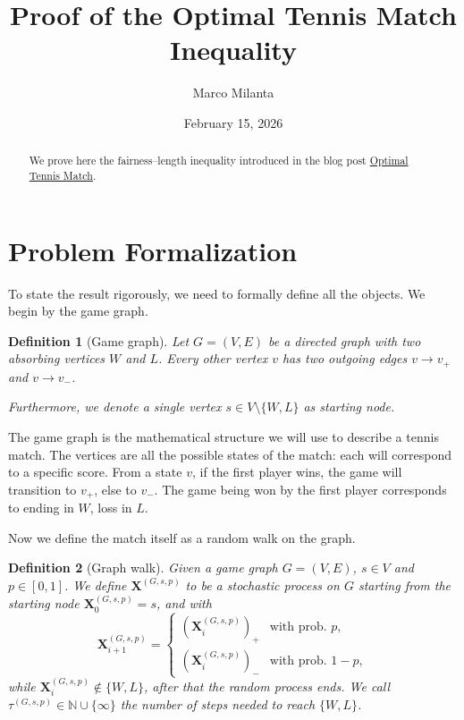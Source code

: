 \documentclass{article}
\newtheorem{definition}{Definition}
\newcommand{\win}{W}
\newcommand{\lose}{L}
\newcommand{\start}{s}
\newcommand{\x}{\mathbf{X}}
\newcommand{\xgp}{\x^{\left(G, s, p\right)}}
\newcommand{\taugp}{{\tau^{\left(G, s, p\right)}}}
\begin{document}
\title{Proof of the Optimal Tennis Match Inequality}
\author{Marco Milanta}
\date{February 15, 2026}
\maketitle

\begin{abstract}
We prove here the fairness--length inequality introduced in the blog post \href{https://mmilanta.github.io/optimal-tennis-match/}{Optimal Tennis Match}.
\end{abstract}

\section*{Problem Formalization}
To state the result rigorously, we need to formally define all the objects. We begin by the game graph.

\begin{definition}[Game graph]
Let $G = (V, E)$ be a directed graph with two absorbing vertices \(\win\) and \(\lose\). Every other vertex \(v\) has two outgoing edges $v\to v_+$ and $v\to v_-$.

Furthermore, we denote a single vertex $\start\in V\setminus \{\win,\lose\}$ as starting node.
\end{definition}

The game graph is the mathematical structure we will use to describe a tennis match. The vertices are all the possible states of the match: each will correspond to a specific score. From a state $v$, if the first player wins, the game will transition to $v_+$, else to $v_-$. The game being won by the first player corresponds to ending in $\win$, loss in $\lose$.

Now we define the match itself as a random walk on the graph.

\begin{definition}[Graph walk]
Given a game graph $G = (V, E)$, $\start \in V$ and $p \in [0,1]$. We define $\xgp$
to be a stochastic process on $G$ starting from the starting node $\xgp_0 = \start$, and with
$$
\xgp_{i+1}= \begin{cases}
\left(\xgp_i\right)_+ & \text{with prob. } p, \\
\left(\xgp_i\right)_- & \text{with prob. } 1 - p,
\end{cases}
$$
while $\xgp_i\notin \{\win, \lose\}$, after that the random process ends. We call $\taugp \in \mathbb N \cup\{\infty\}$ the number of steps needed to reach $\{\win, \lose\}$.
\end{definition}
\end{document}
